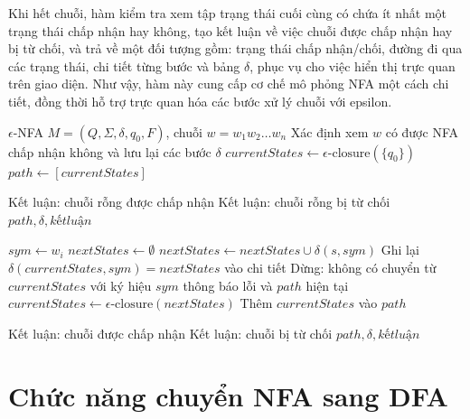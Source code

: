 \documentclass[12pt,a4paper]{report}
\begin{document}
Khi hết chuỗi, hàm kiểm tra xem tập trạng thái cuối cùng có chứa ít nhất một trạng thái chấp nhận hay không, tạo kết luận về việc chuỗi được chấp nhận hay bị từ chối, và trả về một đối tượng gồm: trạng thái chấp nhận/chối, đường đi qua các trạng thái, chi tiết từng bước và bảng \(\delta\), phục vụ cho việc hiển thị trực quan trên giao diện. Như vậy, hàm này cung cấp cơ chế mô phỏng NFA một cách chi tiết, đồng thời hỗ trợ trực quan hóa các bước xử lý chuỗi với epsilon.
\begin{algorithm}[H]
\caption{Mô phỏng một $\epsilon$-NFA với chuỗi đầu vào}
\begin{algorithmic}[1]
\Require $\epsilon$-NFA $M = (Q, \Sigma, \delta, q_0, F)$, chuỗi $w = w_1 w_2 \dots w_n$
\Ensure Xác định xem $w$ có được NFA chấp nhận không và lưu lại các bước $\delta$
\State $currentStates \gets \epsilon\text{-closure}(\{q_0\})$
\State $path \gets [currentStates]$

        \State Kết luận: chuỗi rỗng được chấp nhận
    \Else
        \State Kết luận: chuỗi rỗng bị từ chối
    \EndIf
    \State \Return $path, \delta, kết luận$
\EndIf

    \State $sym \gets w_i$
    \State $nextStates \gets \emptyset$
            \State $nextStates \gets nextStates \cup \delta(s, sym)$
        \EndIf
    \EndFor
    \State Ghi lại $\delta(currentStates, sym) = nextStates$ vào chi tiết
        \State Dừng: không có chuyển từ $currentStates$ với ký hiệu $sym$
        \State \Return thông báo lỗi và $path$ hiện tại
    \EndIf
    \State $currentStates \gets \epsilon\text{-closure}(nextStates)$
    \State Thêm $currentStates$ vào $path$
\EndFor

    \State Kết luận: chuỗi được chấp nhận
\Else
    \State Kết luận: chuỗi bị từ chối
\EndIf
\State \Return $path, \delta, kết luận$
\end{algorithmic}
\end{algorithm}

\section{Chức năng chuyển NFA sang DFA}
\end{document}
